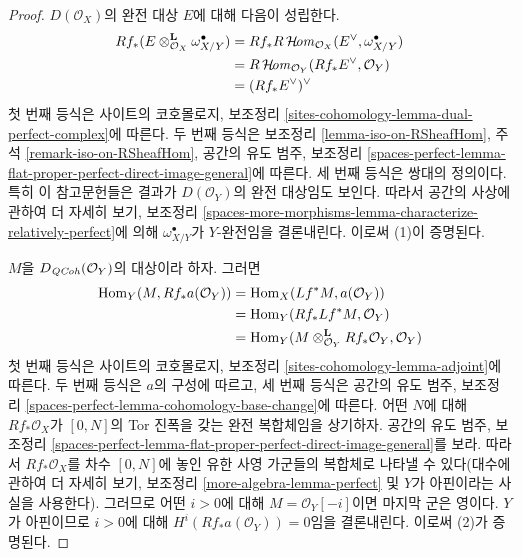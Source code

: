 \begin{proof}
$D(\mathcal{O}_X)$의 완전 대상 $E$에 대해 다음이 성립한다.
\begin{align*}
Rf_*(E \otimes_{\mathcal{O}_X}^\mathbf{L} \omega_{X/Y}^\bullet)
& =
Rf_*R\mathop{\mathcal{H}\!\mathit{om}}\nolimits_{\mathcal{O}_X}(E^\vee, \omega_{X/Y}^\bullet) \\
& =
R\mathop{\mathcal{H}\!\mathit{om}}\nolimits_{\mathcal{O}_Y}(Rf_*E^\vee, \mathcal{O}_Y) \\
& =
(Rf_*E^\vee)^\vee
\end{align*}
첫 번째 등식은 사이트의 코호몰로지, 보조정리
\ref{sites-cohomology-lemma-dual-perfect-complex}에 따른다.
두 번째 등식은 보조정리 \ref{lemma-iso-on-RSheafHom}, 주석
\ref{remark-iso-on-RSheafHom}, 공간의 유도 범주, 보조정리
\ref{spaces-perfect-lemma-flat-proper-perfect-direct-image-general}에
따른다. 세 번째 등식은 쌍대의 정의이다. 특히 이 참고문헌들은 결과가
$D(\mathcal{O}_Y)$의 완전 대상임도 보인다. 따라서 공간의 사상에 관하여
더 자세히 보기, 보조정리
\ref{spaces-more-morphisms-lemma-characterize-relatively-perfect}에 의해
$\omega_{X/Y}^\bullet$가 $Y$-완전임을 결론내린다. 이로써 (1)이
증명된다.

\medskip\noindent
$M$을 $D_{\mathit{QCoh}}(\mathcal{O}_Y)$의 대상이라 하자. 그러면
\begin{align*}
\mathop{\mathrm{Hom}}\nolimits_Y(M, Rf_*a(\mathcal{O}_Y)) & =
\mathop{\mathrm{Hom}}\nolimits_X(Lf^*M, a(\mathcal{O}_Y)) \\
& =
\mathop{\mathrm{Hom}}\nolimits_Y(Rf_*Lf^*M, \mathcal{O}_Y) \\
& =
\mathop{\mathrm{Hom}}\nolimits_Y(M \otimes_{\mathcal{O}_Y}^\mathbf{L} Rf_*\mathcal{O}_Y, \mathcal{O}_Y)
\end{align*}
첫 번째 등식은 사이트의 코호몰로지, 보조정리
\ref{sites-cohomology-lemma-adjoint}에 따른다.
두 번째 등식은 $a$의 구성에 따르고, 세 번째 등식은 공간의 유도 범주,
보조정리 \ref{spaces-perfect-lemma-cohomology-base-change}에 따른다.
어떤 $N$에 대해 $Rf_*\mathcal{O}_X$가 $[0, N]$의 Tor 진폭을 갖는 완전
복합체임을 상기하자. 공간의 유도 범주, 보조정리
\ref{spaces-perfect-lemma-flat-proper-perfect-direct-image-general}를
보라. 따라서 $Rf_*\mathcal{O}_X$를 차수 $[0, N]$에 놓인 유한
사영 가군들의 복합체로 나타낼 수 있다(대수에 관하여 더 자세히 보기,
보조정리 \ref{more-algebra-lemma-perfect} 및 $Y$가 아핀이라는 사실을
사용한다). 그러므로 어떤 $i > 0$에 대해
$M = \mathcal{O}_Y[-i]$이면 마지막 군은 영이다. $Y$가 아핀이므로
$i > 0$에 대해 $H^i(Rf_*a(\mathcal{O}_Y)) = 0$임을 결론내린다.
이로써 (2)가 증명된다.


\end{proof}
